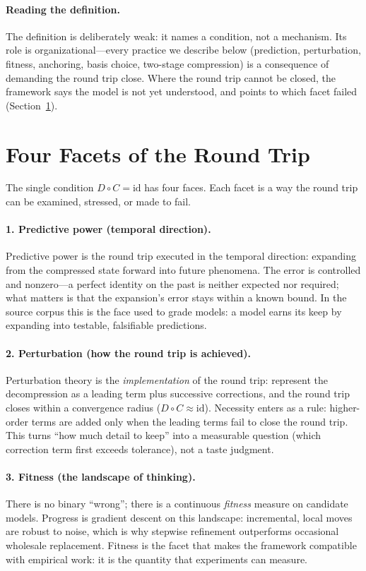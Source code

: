 \documentclass[11pt]{article}
\newcommand{\Cmap}{C}
\newcommand{\Dmap}{D}
\begin{document}
\paragraph{Reading the definition.}
The definition is deliberately weak: it names a condition, not a mechanism. Its
role is organizational---every practice we describe below (prediction,
perturbation, fitness, anchoring, basis choice, two-stage compression) is a
consequence of demanding the round trip close. Where the round trip cannot be
closed, the framework says the model is not yet understood, and points to which
facet failed (Section~\ref{sec:facets}).
\section{Four Facets of the Round Trip}
\label{sec:facets}

The single condition $\Dmap\circ\Cmap=\mathrm{id}$ has four faces. Each facet is
a way the round trip can be examined, stressed, or made to fail.

\paragraph{1. Predictive power (temporal direction).}
Predictive power is the round trip executed in the temporal direction: expanding
from the compressed state forward into future phenomena. The error is
controlled and nonzero---a perfect identity on the past is neither expected nor
required; what matters is that the expansion's error stays within a known bound.
In the source corpus this is the face used to grade models: a model earns its
keep by expanding into testable, falsifiable predictions.

\paragraph{2. Perturbation (how the round trip is achieved).}
Perturbation theory is the \emph{implementation} of the round trip: represent
the decompression as a leading term plus successive corrections, and the round
trip closes within a convergence radius ($\Dmap\circ\Cmap\approx\mathrm{id}$).
Necessity enters as a rule: higher-order terms are added only when the leading
terms fail to close the round trip. This turns ``how much detail to keep'' into
a measurable question (which correction term first exceeds tolerance), not a
taste judgment.

\paragraph{3. Fitness (the landscape of thinking).}
There is no binary ``wrong''; there is a continuous \emph{fitness} measure on
candidate models. Progress is gradient descent on this landscape: incremental,
local moves are robust to noise, which is why stepwise refinement outperforms
occasional wholesale replacement. Fitness is the facet that makes the framework
compatible with empirical work: it is the quantity that experiments can measure.
\end{document}
